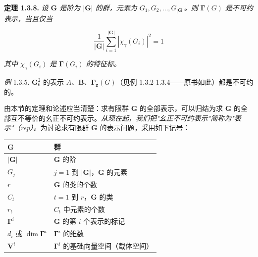 \textbf{定理 1.3.8.} \textit{设 $\mathbf{G}$ 是阶为 $|\mathbf{G}|$ 的群，元素为 $G_{1}, G_{2}, \ldots, G_{|\mathbf{G}|}$。则 $\mathbf{\Gamma}(G)$ 是不可约表示，当且仅当}

\begin{equation*}
\frac{1}{|\mathbf{G}|}\sum_{i=1}^{|\mathbf{G}|} |\chi_{\gamma}(G_{i})|^{2} = 1
\tag{1.3.11}
\end{equation*}

\textit{其中 $\chi_{\gamma}(G_{i})$ 是 $\mathbf{\Gamma}(G_{i})$ 的特征标。}

\textit{例} 1.3.5. $\mathbf{G}_6^2$ 的表示 $A$、$\mathbf{B}$、$\mathbf{\Gamma}_{\mathbf{z}}(G)$（见例 1.3.2 1.3.4——原书如此）都是不可约的。

由本节的定理和论述应当清楚：求有限群 $\mathbf{G}$ 的全部表示，可以归结为求 $\mathbf{G}$ 的全部互不等价的幺正不可约表示。\textit{从现在起，我们把"幺正不可约表示"简称为"表示"（rep）。}为讨论求有限群 $\mathbf{G}$ 的表示问题，采用如下记号：

\medskip
\noindent\begin{tabular}{|l|p{}|}
\hline
$\mathbf{G}$ & 群 \\ \hline
$|\mathbf{G}|$ & $\mathbf{G}$ 的阶 \\ \hline
$G_{j}$ & $j = 1$ 到 $|\mathbf{G}|$，$\mathbf{G}$ 的元素 \\ \hline
$r$ & $\mathbf{G}$ 的类的个数 \\ \hline
$C_{t}$ & $t = 1$ 到 $r$，$\mathbf{G}$ 的类 \\ \hline
$r_{t}$ & $C_{t}$ 中元素的个数 \\ \hline
$\mathbf{\Gamma}^{i}$ & $\mathbf{G}$ 的第 $i$ 个表示的标记 \\ \hline
$d_{i}$ 或 $\dim \mathbf{\Gamma}^{i}$ & $\mathbf{\Gamma}^{i}$ 的维数 \\ \hline
$\mathbf{V}^{i}$ & $\mathbf{\Gamma}^{i}$ 的基础向量空间（载体空间） \\ \hline
\end{tabular}
\medskip

